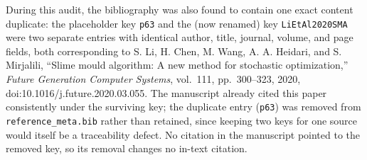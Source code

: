 \documentclass[9pt]{article}
\begin{document}
During this audit, the bibliography was also found to contain one exact content duplicate: the placeholder key \texttt{p63} and the (now renamed) key \texttt{LiEtAl2020SMA} were two separate entries with identical author, title, journal, volume, and page fields, both corresponding to S. Li, H. Chen, M. Wang, A. A. Heidari, and S. Mirjalili, ``Slime mould algorithm: A new method for stochastic optimization,'' \textit{Future Generation Computer Systems}, vol.~111, pp.~300--323, 2020, doi:10.1016/j.future.2020.03.055. The manuscript already cited this paper consistently under the surviving key; the duplicate entry (\texttt{p63}) was removed from \texttt{reference\_meta.bib} rather than retained, since keeping two keys for one source would itself be a traceability defect. No citation in the manuscript pointed to the removed key, so its removal changes no in-text citation.
\end{document}
